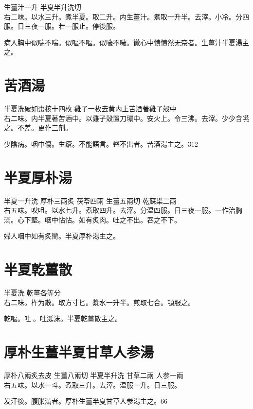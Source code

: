生薑汁{\scriptsize 一升} 半夏{\scriptsize 半升洗切}\\
右二味。以水三升。煮半夏。取二升。内生薑汁。煮取一升半。去滓。小冷。分四服。日三夜一服。若一服止。停後服。

病人胸中似喘不喘。似嘔不嘔。似噦不噦。徹心中憒憒然无奈者。生薑汁半夏湯主之。

\section{苦酒湯}

半夏{\scriptsize 洗破如棗核十四枚} 雞子{\scriptsize 一枚去黄内上苦酒著雞子殼中}\\
右二味。内半夏著苦酒中。以雞子殼置刀環中。安火上。令三沸。去滓。少少含嚥之。不差。更作三剂。

少陰病。咽中傷。生瘡。不能語言。聲不出者。苦酒湯主之。312

\section{半夏厚朴湯}

半夏{\scriptsize 一升洗} 厚朴{\scriptsize 三兩炙} 茯苓{\scriptsize 四兩} 生薑{\scriptsize 五兩切} 乾蘇枼{\scriptsize 二兩}\\
右五味。㕮咀。以水七升。煮取四升。去滓。分温四服。日三夜一服。{\scriptsize 一作治胸滿。心下堅。咽中怗怗。如有炙肉。吐之不出。吞之不下。}

婦人咽中如有炙臠。半夏厚朴湯主之。

\section{半夏乾薑散}

半夏{\scriptsize 洗} 乾薑{\scriptsize 各等分}\\
右二味。杵为散。取方寸匕。漿水一升半。煎取七合。頓服之。

乾嘔。吐{\sungii 𠱘}。吐涎沫。半夏乾薑散主之。

\section{厚朴生薑半夏甘草人参湯}

厚朴{\scriptsize 八兩炙去皮} 生薑{\scriptsize 八兩切} 半夏{\scriptsize 半升洗} 甘草{\scriptsize 二兩} 人参{\scriptsize 一兩}\\
右五味。以水一斗。煮取三升。去滓。温服一升。日三服。

发汗後。腹胀滿者。厚朴生薑半夏甘草人参湯主之。66

